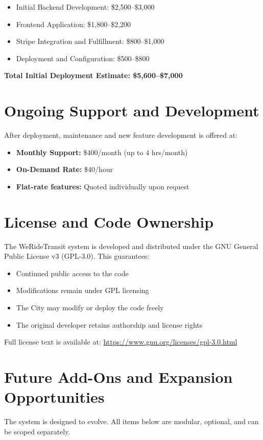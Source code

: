 \documentclass[12pt]{article}
\begin{document}
\begin{itemize}[itemsep=0.5em]
    \item Initial Backend Development: \$2,500–\$3,000
    \item Frontend Application: \$1,800–\$2,200
    \item Stripe Integration and Fulfillment: \$800–\$1,000
    \item Deployment and Configuration: \$500–\$800
\end{itemize}

\textbf{Total Initial Deployment Estimate: \$5,600–\$7,000}

\section{Ongoing Support and Development}
After deployment, maintenance and new feature development is offered at:

\begin{itemize}[itemsep=0.5em]
    \item \textbf{Monthly Support:} \$400/month (up to 4 hrs/month)
    \item \textbf{On-Demand Rate:} \$40/hour
    \item \textbf{Flat-rate features:} Quoted individually upon request
\end{itemize}

\section{License and Code Ownership}
The WeRideTransit system is developed and distributed under the GNU General Public License v3 (GPL-3.0). This guarantees:

\begin{itemize}[itemsep=0.5em]
    \item Continued public access to the code
    \item Modifications remain under GPL licensing
    \item The City may modify or deploy the code freely
    \item The original developer retains authorship and license rights
\end{itemize}

Full license text is available at: \url{https://www.gnu.org/licenses/gpl-3.0.html}

\section{Future Add-Ons and Expansion Opportunities}
The system is designed to evolve. All items below are modular, optional, and can be scoped separately.
\end{document}
